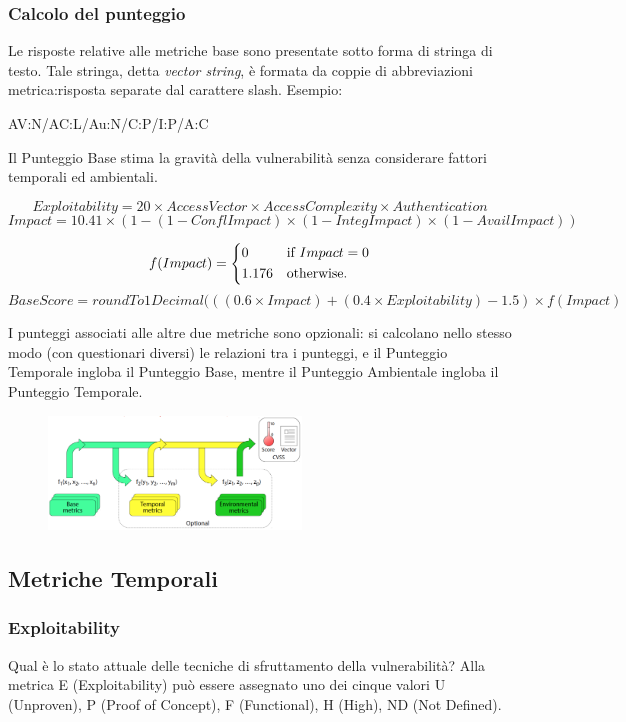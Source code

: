 \subsubsection{Calcolo del punteggio}
Le risposte relative alle metriche base sono
presentate sotto forma di stringa di testo. Tale stringa, detta \textit{vector string}, è formata da coppie
di abbreviazioni metrica:risposta separate dal
carattere slash. Esempio: 
\vspace{5mm}
\begin{center}
AV:N/AC:L/Au:N/C:P/I:P/A:C  
\end{center}
\vspace{5mm}
Il Punteggio Base stima la gravità della vulnerabilità
senza considerare fattori temporali ed ambientali.


\[Exploitability = 20 \times AccessVector \times AccessComplexity \times Authentication\]
\[Impact = 10.41 \times (1-(1- ConflImpact)\times(1-IntegImpact)\times(1-AvailImpact))\]

\[f(Impact) = \begin{dcases*}
        0 & if $Impact = 0$\\
        1.176 & otherwise. 
        \end{dcases*}
        \]
\[BaseScore = roundTo1Decimal(((0.6 \times Impact)+(0.4 \times Exploitability)-1.5) \times f(Impact)\]

I punteggi associati alle altre due metriche sono
opzionali: si calcolano nello stesso modo (con questionari diversi) le relazioni tra i punteggi, e il Punteggio Temporale ingloba il Punteggio Base, mentre il Punteggio Ambientale ingloba il Punteggio Temporale.

\begin{figure}[hbpt!]
    \centering
    \includegraphics[width=0.6\textwidth]{./Images/cap2/2.14.png}
\end{figure}
\FloatBarrier

\subsection{Metriche Temporali}
\subsubsection{Exploitability}
Qual è lo stato attuale delle tecniche
di sfruttamento della vulnerabilità? Alla metrica E (Exploitability) può essere assegnato uno
dei cinque valori U (Unproven), P (Proof of Concept),
F (Functional), H (High), ND (Not Defined).

